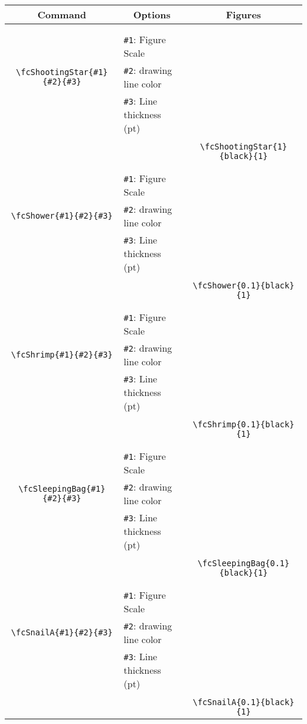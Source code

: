 \documentclass[x11names]{article}
\begin{document}
\begin{table}[H]\centering\begin{tabular}{|c|l|c|}\hline {\bf Command}& \multicolumn{1}{c|}{{\bf Options}} & {\bf Figures}\\  \hline	&&\multirow{5}{*}{\fcShootingStar{1}{black}{1}}\\	&&\\	&\verb|#1|: Figure Scale &\\	\verb|\fcShootingStar{#1}{#2}{#3}|&	\verb|#2|: drawing line color &\\	&\verb|#3|: Line thickness (pt) &\\ &&\\&&	\verb|\fcShootingStar{1}{black}{1}|\\\hline 	
	&&\multirow{5}{*}{\fcShower{0.1}{black}{1}}\\	&&\\	&\verb|#1|: Figure Scale &\\	\verb|\fcShower{#1}{#2}{#3}|&	\verb|#2|: drawing line color &\\	&\verb|#3|: Line thickness (pt) &\\ &&\\&&	\verb|\fcShower{0.1}{black}{1}|\\\hline 	
	&&\multirow{5}{*}{\fcShrimp{0.1}{black}{1}}\\	&&\\	&\verb|#1|: Figure Scale &\\	\verb|\fcShrimp{#1}{#2}{#3}|&	\verb|#2|: drawing line color &\\	&\verb|#3|: Line thickness (pt) &\\ &&\\&&	\verb|\fcShrimp{0.1}{black}{1}|\\\hline 	
	&&\multirow{5}{*}{\fcSleepingBag{0.1}{black}{1}}\\	&&\\	&\verb|#1|: Figure Scale &\\	\verb|\fcSleepingBag{#1}{#2}{#3}|&	\verb|#2|: drawing line color &\\	&\verb|#3|: Line thickness (pt) &\\ &&\\&&	\verb|\fcSleepingBag{0.1}{black}{1}|\\\hline 	
	&&\multirow{5}{*}{\fcSnailA{0.1}{black}{1}}\\	&&\\	&\verb|#1|: Figure Scale &\\	\verb|\fcSnailA{#1}{#2}{#3}|&	\verb|#2|: drawing line color &\\	&\verb|#3|: Line thickness (pt) &\\ &&\\&&	\verb|\fcSnailA{0.1}{black}{1}|\\\hline 	

\end{tabular}
\end{table}
\end{document}
